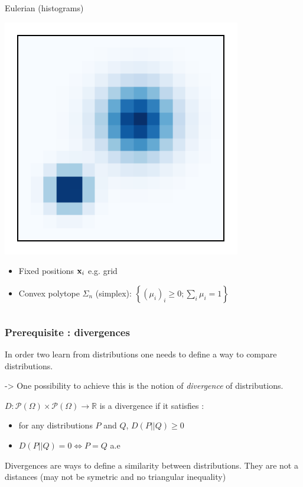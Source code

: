 \documentclass[french,9pt]{beamer}
\newcommand{\x}{{\bf x}}
\begin{document}
\begin{frame}
\begin{columns}[t]
\begin{column}{.45\linewidth}
\begin{block}{Eulerian (histograms)}
\begin{center}
\includegraphics[width=.7\linewidth]{fig/distrib_hist.pdf}
\end{center}\vspace{-5mm}
\begin{itemize}
\item Fixed positions $\x_i$ e.g. grid
\item Convex polytope $\Sigma_n$ (simplex):
$\left\{(\mu_i)_i\geq 0; \sum_i \mu_i=1\right\}$
\end{itemize}
\end{block}
\end{column}
\end{columns}
\end{frame}



\begin{frame}
\frametitle{Prerequisite : divergences}

In order two learn from distributions one needs to define a way to compare distributions. 

-> One possibility to achieve this is the notion of \emph{divergence} of distributions.

\pause 

$D: \mathcal{P}(\Omega) \times  \mathcal{P}(\Omega) \rightarrow \mathbb{R}$ is a divergence if it satisfies :

\begin{itemize}
\item for any distributions $P$ and $Q$, $D(P||Q) \geq 0$
\item $D(P||Q) = 0 \iff P=Q $ a.e
\end{itemize}

\pause 
Divergences are ways to define a similarity between distributions. They are not a distances (may not be symetric and no triangular inequality)

\end{frame}
\end{document}
